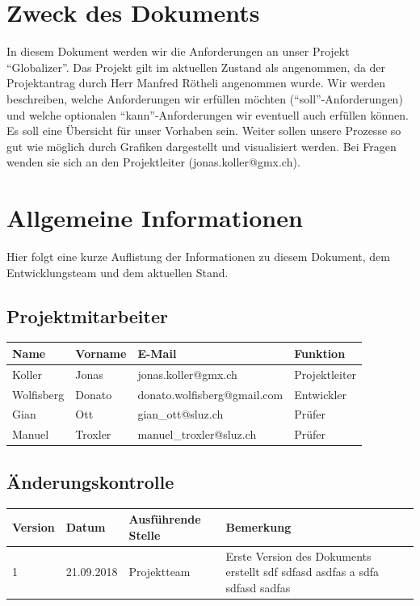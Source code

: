 \documentclass[12pt]{article}
\begin{document}
  \section{Zweck des Dokuments}
    In diesem Dokument werden wir die Anforderungen an unser Projekt “Globalizer”.
    Das Projekt gilt im aktuellen Zustand als angenommen,
    da der Projektantrag durch Herr Manfred Rötheli angenommen wurde. Wir werden be\-schreiben,
    welche Anforderungen wir erfüllen möchten (“soll”-Anforderungen) und welche optionalen
    “kann”-Anforderungen wir eventuell auch erfüllen können.
    Es soll eine Übersicht für unser Vorhaben sein. Weiter sollen unsere Prozesse
    so gut wie möglich durch Grafiken dargestellt und visualisiert werden.
    Bei Fragen wenden sie sich an den Projektleiter (jonas.koller@gmx.ch).

  \section{Allgemeine Informationen}
    Hier folgt eine kurze Auflistung der Informationen zu diesem Dokument,
    dem Entwicklungsteam und dem aktuellen Stand.

  \subsection{Projektmitarbeiter}
    \begin{table}[h]
      \begin{tabularx}{\textwidth}{|l|l|X|l|}
        \hline
        \textbf{Name} & \textbf{Vorname}  & \textbf{E-Mail}                & \textbf{Funktion}     \\ \hline
        Koller        & Jonas             & jonas.koller@gmx.ch            & Projektleiter         \\ \hline
        Wolfisberg    & Donato            & donato.wolfisberg@gmail.com    & Entwickler            \\ \hline
        Gian          & Ott               & gian\_ott@sluz.ch              & Prüfer                \\ \hline
        Manuel        & Troxler           & manuel\_troxler@sluz.ch        & Prüfer                \\ \hline
      \end{tabularx}%
    \end{table}

  \subsection{Änderungskontrolle}
    \begin{table}[h]
      \begin{tabularx}{\textwidth}{|l|l|l|X|}
        \hline
        \textbf{Version} & \textbf{Datum} & \textbf{Ausführende Stelle} & \textbf{Bemerkung}                                                          \\ \hline
        1                & 21.09.2018     & Projektteam                 & Erste Version des Dokuments erstellt sdf sdfasd asdfas a sdfa sdfasd sadfas \\ \hline
      \end{tabularx}
    \end{table}
\end{document}

